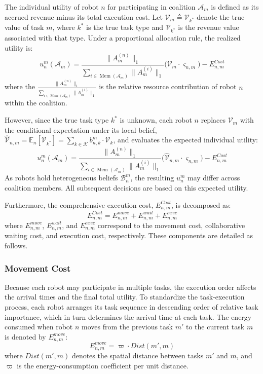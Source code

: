 \documentclass[journal,twoside,web]{ieeecolor}
\begin{document}
The individual utility of robot $n$ for participating in coalition $\mathcal{A}_m$ is defined as its accrued revenue minus its total execution cost. Let $\mathcal{V}_m \triangleq \mathcal{V}_{k^*}$ denote the true value of task $m$, where $k^*$ is the true task type and $\mathcal{V}_{k^*}$ is the revenue value associated with that type. Under a proportional allocation rule, the realized utility is:
\begin{equation}
u_n^m(\mathcal{A}_m) = \frac{\|A_m^{(n)}\|_1}{\sum\limits_{i \in \operatorname{Mem}(\mathcal{A}_m)} \|A_m^{(i)}\|_1} \Big( \mathcal{V}_{m} \cdot \varsigma_{n,m} \Big) - E_{n,m}^{Cost}
\label{eq:true_utility}
\end{equation}
where the $\frac{\|A_m^{(n)}\|_1}{\sum_{i \in \operatorname{Mem}(\mathcal{A}_m)} \|A_m^{(i)}\|_1}$ is the relative resource contribution of robot $n$ within the coalition.

However, since the true task type $k^*$ is unknown, each robot $n$ replaces $\mathcal{V}_m$ with the conditional expectation under its local belief, $\widehat{\mathcal{V}}_{n,m} = \mathbb{E}_n[\mathcal{V}_{k^*}] = \sum_{k \in \mathcal{K}} b_{n,k}^m \cdot \mathcal{V}_k$, and evaluates the expected individual utility:
\begin{equation}
u_n^m(\mathcal{A}_m) = \frac{\|A_m^{(n)}\|_1}{\sum\limits_{i \in \operatorname{Mem}(\mathcal{A}_m)} \|A_m^{(i)}\|_1} \Big( \widehat{\mathcal{V}}_{n,m} \cdot \varsigma_{n,m} \Big) - E_{n,m}^{Cost}
\label{eq:expected_utility}
\end{equation}
As robots hold heterogeneous beliefs $\mathcal{B}_n^m$, the resulting $u_n^m$ may differ across coalition members. All subsequent decisions are based on this expected utility.

Furthermore, the comprehensive execution cost, $E_{n,m}^{Cost}$, is decomposed as:
\begin{equation}
E_{n,m}^{Cost} = E_{n,m}^{move} + E_{n,m}^{wait} + E_{n,m}^{exec}
\label{eq:total_cost}
\end{equation}
where $E_{n,m}^{move}$, $E_{n,m}^{wait}$, and $E_{n,m}^{exec}$ correspond to the movement cost, collaborative waiting cost, and execution cost, respectively. These components are detailed as follows.
\subsubsection{Movement Cost}

Because each robot may participate in multiple tasks, the execution order affects the arrival times and the final total utility. To standardize the task-execution process, each robot arranges its task sequence in descending order of relative task importance, which in turn determines the arrival time at each task. The energy consumed when robot $n$ moves from the previous task $m'$ to the current task $m$ is denoted by $E_{n,m}^{move}$:
\begin{equation}
E_{n,m}^{move} = \varpi \cdot Dist(m', m)
\label{eq:cost_move}
\end{equation}
where $Dist(m', m)$ denotes the spatial distance between tasks $m'$ and $m$, and $\varpi$ is the energy-consumption coefficient per unit distance.
\end{document}
